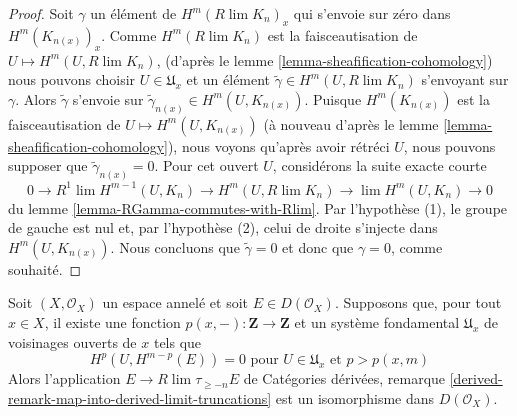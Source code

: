 \begin{proof}

Soit $\gamma$ un élément de $H^m(R\lim K_n)_x$ qui s'envoie sur zéro dans $H^m(K_{n(x)})_x$. Comme $H^m(R\lim K_n)$ est la faisceautisation de $U \mapsto H^m(U, R\lim K_n)$,
(d'après le lemme \ref{lemma-sheafification-cohomology}) nous pouvons choisir $U \in \mathfrak{U}_x$
et un élément $\tilde \gamma \in H^m(U, R\lim K_n)$ s'envoyant sur $\gamma$. Alors $\tilde\gamma$ s'envoie sur $\tilde\gamma_{n(x)} \in H^m(U, K_{n(x)})$. Puisque $H^m(K_{n(x)})$ est la faisceautisation de
$U \mapsto H^m(U, K_{n(x)})$
(à nouveau d'après le lemme \ref{lemma-sheafification-cohomology}), nous voyons qu'après avoir rétréci $U$, nous pouvons supposer que $\tilde\gamma_{n(x)} = 0$. Pour cet ouvert $U$, considérons la suite exacte courte
$$
0 \to
R^1\lim H^{m - 1}(U, K_n) \to H^m(U, R\lim K_n) \to
\lim H^m(U, K_n) \to 0
$$
du lemme \ref{lemma-RGamma-commutes-with-Rlim}. Par l'hypothèse (1), le groupe de gauche est nul et, par l'hypothèse (2), celui de droite s'injecte dans $H^m(U, K_{n(x)})$. Nous concluons que $\tilde\gamma = 0$
et donc que $\gamma = 0$, comme souhaité.

\end{proof}

\begin{lemma}

\label{lemma-is-limit-per-point}

Soit $(X, \mathcal{O}_X)$ un espace annelé et soit $E \in D(\mathcal{O}_X)$. Supposons que, pour tout $x \in X$, il existe une fonction $p(x, -) : \mathbf{Z} \to \mathbf{Z}$ et un système fondamental $\mathfrak{U}_x$ de voisinages ouverts de $x$
tels que
$$
H^p(U, H^{m - p}(E)) = 0 \text{ pour }
U \in \mathfrak{U}_x \text{ et } p > p(x, m)
$$
Alors l'application $E \to R\lim \tau_{\geq -n} E$ de Catégories dérivées, remarque
\ref{derived-remark-map-into-derived-limit-truncations}
est un isomorphisme dans $D(\mathcal{O}_X)$.

\end{lemma}

